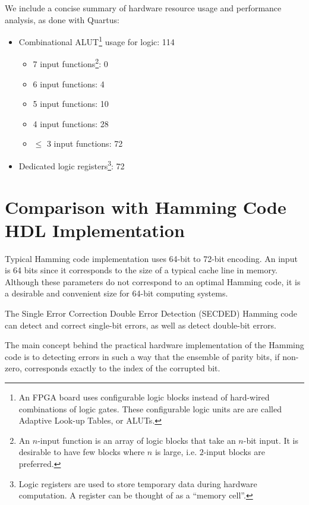 \documentclass[conference]{IEEEtran}
\begin{document}
We include a concise summary of hardware resource usage and performance analysis, as done with Quartus:
\begin{itemize}
  \item Combinational ALUT\footnote{An FPGA board uses configurable logic blocks instead of hard-wired combinations of logic gates. These configurable logic units are are called Adaptive Look-up Tables, or ALUTs.} usage for logic: 114 \begin{itemize}
      \item 7 input functions\footnote{An $n$-input function is an array of logic blocks that take an $n$-bit input. It is desirable to have few blocks where $n$ is large, i.e. $2$-input blocks are preferred.}: 0
    \item 6 input functions: 4
    \item 5 input functions: 10
    \item 4 input functions: 28
    \item $\leq$ 3 input functions: 72
  \end{itemize}
\item Dedicated logic registers\footnote{Logic registers are used to store temporary data during hardware computation. A register can be thought of as a ``memory cell''.}: 72
\end{itemize}

\section{Comparison with Hamming Code HDL Implementation}
Typical Hamming code implementation uses 64-bit to 72-bit encoding.
An input is 64 bits since it corresponds to the size of a typical cache line in memory.
Although these parameters do not correspond to an optimal Hamming code, it is a desirable and convenient size for 64-bit computing systems.

The Single Error Correction Double Error Detection (SECDED) Hamming code can detect and correct single-bit errors, as well as detect double-bit errors.

The main concept behind the practical hardware implementation of the Hamming code is to detecting errors in such a way that the ensemble of parity bits, if non-zero, corresponds exactly to the index of the corrupted bit.
\end{document}
